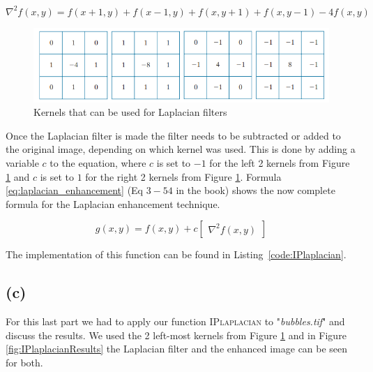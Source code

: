 \documentclass{article}
\begin{document}
\begin{equation}\label{eq:laplacian_filter}
    \nabla^{2} f(x, y)=f(x+1, y)+f(x-1, y)+f(x, y+1)+f(x, y-1)-4 f(x, y)
\end{equation}

\begin{figure}[h]
    \centering
    \includegraphics[width=\textwidth]{Assignment_1/input_images/kernels.png}
    \caption{Kernels that can be used for Laplacian filters \cite{gonzalez2008digital}}
    \label{fig:kernels}
\end{figure}

Once the Laplacian filter is made the filter needs to be subtracted or added to the original image, depending on which kernel was used. This is done by adding a variable $c$ to the equation, where $c$ is set to $-1$ for the left 2 kernels from Figure \ref{fig:kernels} and $c$ is set to $1$ for the right 2 kernels from Figure \ref{fig:kernels}. Formula \ref{eq:laplacian_enhancement} (Eq $3-54$ in the book) shows the now complete formula for the Laplacian enhancement technique.

\begin{equation}\label{eq:laplacian_enhancement}
    g(x, y)=f(x, y)+c\left[\begin{array}{c} \nabla^{2} f(x, y)\end{array}\right]
\end{equation}

The implementation of this function can be found in  Listing~\ref{code:IPlaplacian}.

\subsection*{(c)}
For this last part we had to apply our function \textsc{IPlaplacian} to "\textit{bubbles.tif}" and discuss the results. We used the 2 left-most kernels from Figure \ref{fig:kernels} and in Figure \ref{fig:IPlaplacianResults} the Laplacian filter and the enhanced image can be seen for both.
\end{document}
